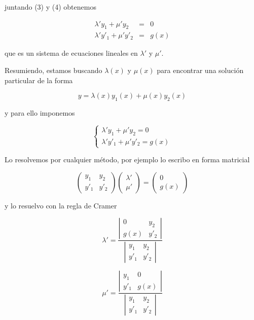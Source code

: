 juntando (3) y (4) obtenemos

\begin{eqnarray} \lambda' y_1 + \mu' y_2 &=& 0 \\
\lambda' y'_1 + \mu' y'_2 &=& g(x) \end{eqnarray}

que es un sistema de ecuaciones lineales en $\lambda'$ y $\mu'$.  

Resumiendo, estamos buscando $\lambda(x)$ y $\mu(x)$ para encontrar una solución particular de la forma

$$ y = \lambda(x) y_1(x) + \mu(x) y_2(x) $$

y para ello imponemos

$$ \begin{cases} \lambda' y_1 + \mu' y_2 = 0 \\
\lambda' y'_1 + \mu' y'_2 = g(x) \end{cases}$$

Lo resolvemos por cualquier método, por ejemplo lo escribo en forma matricial

$$ \begin{pmatrix} y_1 & y_2 \\ y'_1 & y'_2 \end{pmatrix} \begin{pmatrix} \lambda' \\ \mu' \end{pmatrix} = \begin{pmatrix} 0 \\ g(x) \end{pmatrix}$$

y lo resuelvo con la regla de Cramer

$$ \lambda' = \frac{\left| \begin{matrix} 0 & y_2 \\ g(x) & y'_2 \end{matrix} \right|}{\left| \begin{matrix} y_1 & y_2 \\ y'_1 & y'_2 \end{matrix} \right|}$$

$$ \mu' = \frac{\left| \begin{matrix} y_1 & 0 \\ y'_1 & g(x) \end{matrix} \right|}{\left| \begin{matrix} y_1 & y_2 \\ y'_1 & y'_2 \end{matrix} \right|}$$

